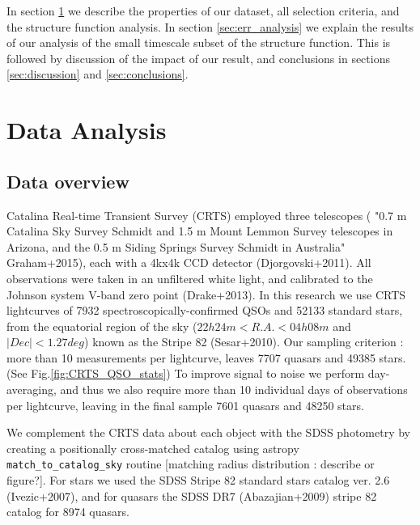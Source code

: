 \documentclass[fleqn,usenatbib]{mnras}  %
\begin{document}
In section \ref{sec:obs} we describe the properties of our dataset, all selection criteria, and the structure function analysis.  In section \ref{sec:err_analysis} we explain the results of our analysis of the small timescale subset of the structure function. This is followed by discussion of the impact of our result, and conclusions in sections \ref{sec:discussion} and \ref{sec:conclusions}.
 

\section{Data Analysis}
\label{sec:obs}

\subsection{Data overview}

Catalina Real-time Transient Survey (CRTS) employed three telescopes ( "0.7 m Catalina Sky Survey Schmidt and 1.5 m Mount Lemmon Survey telescopes in Arizona, and the 0.5 m Siding Springs Survey Schmidt in Australia" Graham+2015), each with a  4kx4k CCD detector (Djorgovski+2011). All observations were taken in an unfiltered white light, and calibrated to the Johnson system V-band zero point (Drake+2013). In this research we use CRTS lightcurves of 7932 spectroscopically-confirmed QSOs and 52133 standard stars, from the equatorial region of the sky ($22h 24m < R.A. < 04h 08m$ and $| Dec | < 1.27 deg$)  known as the Stripe 82 (Sesar+2010). Our sampling criterion : more than 10 measurements per lightcurve, leaves 7707 quasars and 49385 stars. (See Fig.\ref{fig:CRTS_QSO_stats}) To improve signal to noise we perform day-averaging, and thus we  also require more than 10 individual days of observations per lightcurve, leaving in the final sample 7601 quasars and 48250 stars. 

We complement the CRTS data about each object  with the SDSS photometry by creating a positionally cross-matched catalog using astropy  \verb|match_to_catalog_sky| routine [matching radius distribution : describe or figure?]. For stars we used the SDSS Stripe 82 standard stars catalog  ver. 2.6  (Ivezic+2007), and for quasars the SDSS DR7 (Abazajian+2009) stripe 82 catalog for  8974 quasars.  
\end{document}
